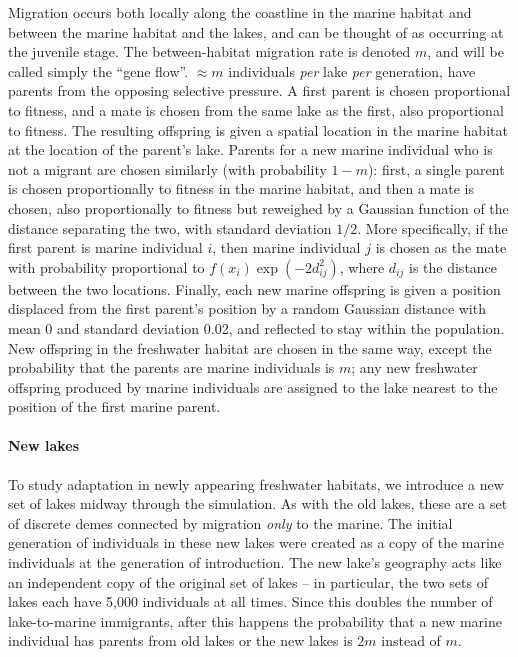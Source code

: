 \documentclass{article}
\begin{document}
Migration occurs both locally along the coastline in the marine habitat
and between the marine habitat and the lakes,
and can be thought of as occurring at the juvenile stage.
The between-habitat migration rate is denoted $m$,
and will be called simply the ``gene flow''.
$\approx m$ individuals \emph{per} lake \emph{per} generation, have parents from the opposing selective pressure.
A first parent is chosen proportional to fitness,
and a mate is chosen from the same lake as the first, also proportional to fitness.
The resulting offspring is given a spatial location in the marine habitat
at the location of the parent's lake.
Parents for a new marine individual who is not a migrant are chosen similarly (with probability $1-m$):
first, a single parent is chosen proportionally to fitness in the marine habitat,
and then a mate is chosen, 
also proportionally to fitness but reweighed by a Gaussian function 
of the distance separating the two, with standard deviation $1/2$. 
More specifically, if the first parent is marine individual $i$,
then marine individual $j$ is chosen as the mate
with probability proportional to $f(x_i) \exp(-2d_{ij}^2)$,
where $d_{ij}$ is the distance between the two locations.
Finally, each new marine offspring is given a position 
displaced from the first parent's position by a random Gaussian distance
with mean 0 and standard deviation 0.02, and reflected to stay within the population.
New offspring in the freshwater habitat are chosen in the same way,
except the probability that the parents are marine individuals is $m$;
any new freshwater offspring produced by marine individuals
are assigned to the lake nearest to the position of the first marine parent.

\paragraph{New lakes}
To study adaptation in newly appearing freshwater habitats,
we introduce a new set of lakes midway through the simulation.
As with the old lakes, these are a set of discrete demes connected by migration \emph{only} to the marine.
The initial generation of individuals in these new lakes were created as a copy of the marine individuals 
at the generation of introduction.
The new lake's geography acts like an independent copy of the original set of lakes -- in particular,
the two sets of lakes each have 5,000 individuals at all times.
Since this doubles the number of lake-to-marine immigrants,
after this happens the probability that a new marine individual has parents from old lakes or the new lakes
is $2m$ instead of $m$.
\end{document}
